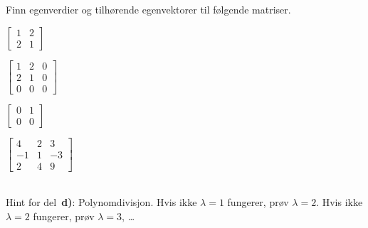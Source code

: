 
\begin{oppgave}
Finn egenverdier og tilhørende egenvektorer til følgende matriser.
\\[-8pt]
\begin{minipage}[t]{.20\textwidth}
\begin{punkt}
$
\begin{bmatrix}
1 & 2\\
2 & 1
\end{bmatrix}$
\end{punkt}

\begin{punkt}
$\begin{bmatrix}
1 & 2 & 0\\
2 & 1 & 0\\
0 & 0 & 0
\end{bmatrix}$
\end{punkt}
\end{minipage}
\begin{minipage}[t]{.20\textwidth}
\begin{punkt}
$\begin{bmatrix}
0 & 1 \\
0 & 0 
\end{bmatrix}$

\end{punkt}


\begin{punkt}
$\begin{bmatrix}
4 & 2 & 3\\
-1 & 1 & -3\\
2 & 4 & 9
\end{bmatrix}$
\end{punkt}
\end{minipage}
\\[5pt]
Hint for del~\textbf{d)}: Polynomdivisjon. Hvis ikke $\lambda=1$ fungerer, prøv
$\lambda=2$. Hvis ikke $\lambda=2$ fungerer, prøv $\lambda=3$, \ldots
\end{oppgave}



